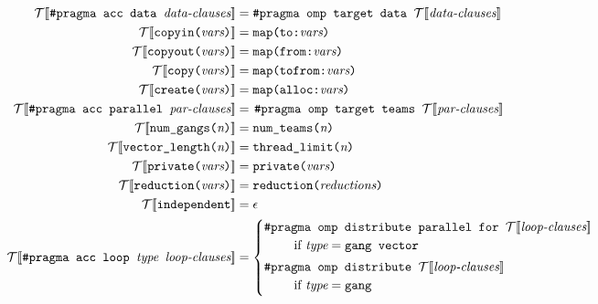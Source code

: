\documentclass{sig-alternate-05-2015}
\begin{document}
\newcommand{\translate}[1]{\ensuremath{\mathcal{T}[\![ #1 ]\!]}}
\begin{figure*}
\begin{align*}
%
\translate{\texttt{\#pragma acc data\ }\textit{data-clauses}} &=
   \texttt{\#pragma omp target data } \translate{\textit{data-clauses}} \\
%
\translate{\texttt{copyin(}\textit{vars}\texttt{)}} &=
   \texttt{map(to:}\textit{vars}\texttt{)} \\
%
\translate{\texttt{copyout(}\textit{vars}\texttt{)}} &=
   \texttt{map(from:}\textit{vars}\texttt{)} \\
%
\translate{\texttt{copy(}\textit{vars}\texttt{)}} &=
   \texttt{map(tofrom:}\textit{vars}\texttt{)} \\
%
\translate{\texttt{create(}\textit{vars}\texttt{)}} &=
   \texttt{map(alloc:}\textit{vars}\texttt{)} \\
%
\translate{\texttt{\#pragma acc parallel\ }\textit{par-clauses}} &=
   \left.\parbox[t]{4in}{%
   \texttt{\#pragma omp target teams\ }\translate{\textit{par-clauses}}}\right. \\
%
\translate{\texttt{num\_gangs(}\textit{n}\texttt{)}} &=
   \texttt{num\_teams(}\textit{n}\texttt{)} \\
%
\translate{\texttt{vector\_length(}\textit{n}\texttt{)}} &=
   \texttt{thread\_limit(}\textit{n}\texttt{)} \\
%
\translate{\texttt{private(}\textit{vars}\texttt{)}} &=
   \texttt{private(}\textit{vars}\texttt{)} \\
%
\translate{\texttt{reduction(}\textit{vars}\texttt{)}} &=
   \texttt{reduction(}\textit{reductions}\texttt{)} \\
%
\translate{\texttt{independent}} &=
   \epsilon \\
%
\translate{\texttt{\#pragma acc loop\ }\textit{type}\texttt{\ }\textit{loop-clauses}} &=
   \begin{cases}
   \texttt{\#pragma omp distribute parallel for\ }\translate{\textit{loop-clauses}} \\
        \hspace*{2em} \textup{ if $\textit{type} = \texttt{gang vector}$} \vspace*{.25em} \\
   \texttt{\#pragma omp distribute\ }\translate{\textit{loop-clauses}} \\
        \hspace*{2em} \textup{ if $\textit{type} = \texttt{gang}$} \vspace*{.25em} \\

\end{cases}
\end{align*}
\end{figure*}
\end{document}
